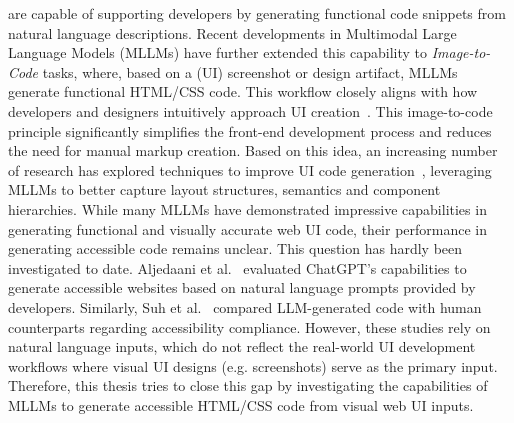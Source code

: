 are capable of supporting developers by generating functional code 
snippets from natural language descriptions. Recent developments in 
Multimodal Large Language Models (MLLMs) have further extended this capability to
\textit{Image-to-Code} tasks, where, based on a (UI) screenshot or design 
artifact,
MLLMs generate functional HTML/CSS code. This workflow closely aligns 
with how developers and designers intuitively approach UI
creation~\cite{chen2018ui,feng2022auto}. This image-to-code 
principle significantly simplifies the front-end development process and 
reduces the need for manual markup creation. Based on this idea,
an increasing number of research has explored techniques to improve 
UI code generation~\cite{cali2025prototype,mowar2025codea11y,wu2025ui2code}, 
leveraging MLLMs to better capture layout structures, semantics 
and component hierarchies. 
\newline While many MLLMs have demonstrated impressive capabilities 
in generating functional and visually accurate web UI code, 
their performance in generating accessible code remains unclear.
This question has hardly been investigated to date. 
Aljedaani et al.~\cite{aljedaani2024chatgpt} evaluated ChatGPT's
capabilities to generate accessible websites based on natural 
language prompts provided by developers. Similarly, Suh et 
al.~\cite{suh2025accessiblecode} compared LLM-generated code
with human counterparts regarding accessibility compliance.
However, these studies rely on natural language inputs, which do
not reflect the real-world UI development workflows where visual 
UI designs (e.g. screenshots) serve as the primary input. Therefore,
this thesis tries to close this gap by investigating the capabilities 
of MLLMs to generate accessible HTML/CSS code from visual web 
UI inputs. 

